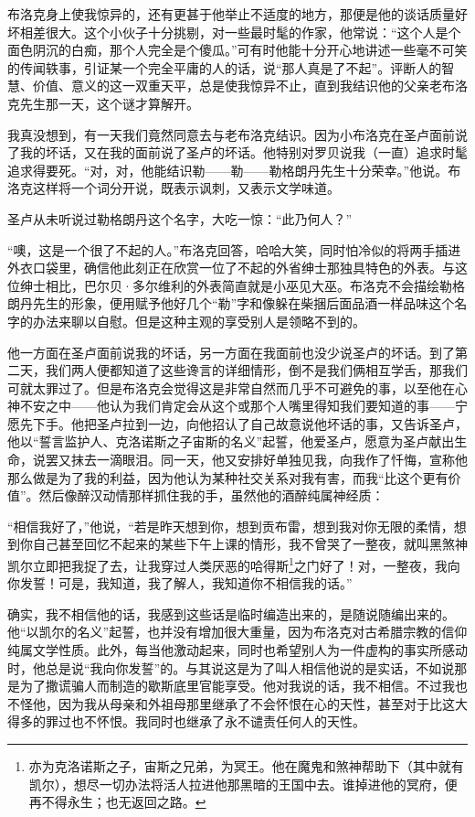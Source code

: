 \par 布洛克身上使我惊异的，还有更甚于他举止不适度的地方，那便是他的谈话质量好坏相差很大。这个小伙子十分挑剔，对一些最时髦的作家，他常说：“这个人是个面色阴沉的白痴，那个人完全是个傻瓜。”可有时他能十分开心地讲述一些毫不可笑的传闻轶事，引证某一个完全平庸的人的话，说“那人真是了不起”。评断人的智慧、价值、意义的这一双重天平，总是使我惊异不止，直到我结识他的父亲老布洛克先生那一天，这个谜才算解开。
\par 我真没想到，有一天我们竟然同意去与老布洛克结识。因为小布洛克在圣卢面前说了我的坏话，又在我的面前说了圣卢的坏话。他特别对罗贝说我（一直）追求时髦追求得要死。“对，对，他能结识勒——勒——勒格朗丹先生十分荣幸。”他说。布洛克这样将一个词分开说，既表示讽刺，又表示文学味道。
\par 圣卢从未听说过勒格朗丹这个名字，大吃一惊：“此乃何人？”
\par “噢，这是一个很了不起的人。”布洛克回答，哈哈大笑，同时怕冷似的将两手插进外衣口袋里，确信他此刻正在欣赏一位了不起的外省绅士那独具特色的外表。与这位绅士相比，巴尔贝·多尔维利的外表简直就是小巫见大巫。布洛克不会描绘勒格朗丹先生的形象，便用赋予他好几个“勒”字和像躲在柴捆后面品酒一样品味这个名字的办法来聊以自慰。但是这种主观的享受别人是领略不到的。
\par 他一方面在圣卢面前说我的坏话，另一方面在我面前也没少说圣卢的坏话。到了第二天，我们两人便都知道了这些谗言的详细情形，倒不是我们俩相互学舌，那我们可就太罪过了。但是布洛克会觉得这是非常自然而几乎不可避免的事，以至他在心神不安之中——他认为我们肯定会从这个或那个人嘴里得知我们要知道的事——宁愿先下手。他把圣卢拉到一边，向他招认了自己故意说他坏话的事，又告诉圣卢，他以“誓言监护人、克洛诺斯之子宙斯的名义”起誓，他爱圣卢，愿意为圣卢献出生命，说罢又抹去一滴眼泪。同一天，他又安排好单独见我，向我作了忏悔，宣称他那么做是为了我的利益，因为他认为某种社交关系对我有害，而我“比这个更有价值”。然后像醉汉动情那样抓住我的手，虽然他的酒醉纯属神经质：
\par “相信我好了，”他说，“若是昨天想到你，想到贡布雷，想到我对你无限的柔情，想到你自己甚至回忆不起来的某些下午上课的情形，我不曾哭了一整夜，就叫黑煞神凯尔立即把我捉了去，让我穿过人类厌恶的哈得斯\footnote{亦为克洛诺斯之子，宙斯之兄弟，为冥王。他在魔鬼和煞神帮助下（其中就有凯尔），想尽一切办法将活人拉进他那黑暗的王国中去。谁掉进他的冥府，便再不得永生；也无返回之路。}之门好了！对，一整夜，我向你发誓！可是，我知道，我了解人，我知道你不相信我的话。”
\par 确实，我不相信他的话，我感到这些话是临时编造出来的，是随说随编出来的。他“以凯尔的名义”起誓，也并没有增加很大重量，因为布洛克对古希腊宗教的信仰纯属文学性质。此外，每当他激动起来，同时也希望别人为一件虚构的事实所感动时，他总是说“我向你发誓”的。与其说这是为了叫人相信他说的是实话，不如说那是为了撒谎骗人而制造的歇斯底里官能享受。他对我说的话，我不相信。不过我也不怪他，因为我从母亲和外祖母那里继承了不会怀恨在心的天性，甚至对于比这大得多的罪过也不怀恨。我同时也继承了永不谴责任何人的天性。
